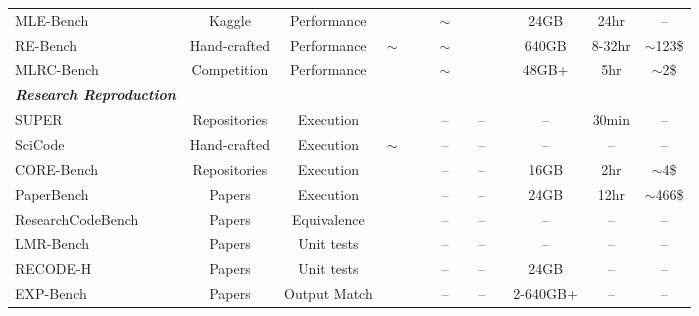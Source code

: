 \documentclass[11pt]{article}
\let\cite\citep
\newcommand{\gtick}{\textcolor{green!60!black}{\ding{51}}}
\newcommand{\rcross}{\textcolor{red!70!black}{\ding{55}}}
\theoremstyle{plain}
\theoremstyle{definition}
\theoremstyle{remark}
\begin{document}
\begin{table}[ht]
{\begin{tabularx}{1.2\textwidth}{@{}l*{12}{c}}
MLE-Bench \cite{chan2025mlebench}           & Kaggle & Performance & \rcross & \rcross & \gtick & $\sim$  & \rcross & \rcross & \rcross & 24GB & 24hr & -- \\
RE-Bench \cite{wijk2025rebench}             & Hand-crafted & Performance & $\sim$ & \rcross & \gtick & $\sim$  & \rcross & \rcross & \rcross & 640GB & 8-32hr & $\sim$123\$ \\
MLRC-Bench \cite{zhang2025mlrcbenchlanguageagentssolve} & Competition & Performance & \rcross & \rcross & \gtick & $\sim$ & \rcross & \gtick & \rcross & 48GB+ & 5hr & $\sim$2\$\\
\midrule
\textbf{\emph{Research Reproduction}} &  &  &  &  &  &  &  &  &  \\
\midrule
SUPER \cite{bogin-etal-2024-super}          & Repositories & Execution & \rcross & \rcross & \rcross & -- & \rcross & -- & \gtick & -- & 30min & --\\
SciCode \cite{tian2024scicode}               & Hand-crafted & Execution & $\sim$ & \rcross & \gtick & -- & \rcross & -- & \gtick & -- & -- & --\\
CORE-Bench \cite{siegel2024corebench}      & Repositories & Execution & \rcross & \gtick & \gtick & -- & \gtick & -- & \gtick & 16GB & 2hr & $\sim$4\$\\
PaperBench \cite{starace2025paperbench}      & Papers & Execution & \gtick & \rcross & \gtick & -- & \gtick & -- & \rcross & 24GB & 12hr & $\sim$466\$\\
ResearchCodeBench \cite{hua2025researchcodebenchbenchmarkingllmsimplementing} & Papers & Equivalence & \rcross & \gtick & \gtick & -- & \rcross & -- & \gtick & -- & -- & --\\
LMR-Bench \cite{yan2025lmrbenchevaluatingllmagents} & Papers & Unit tests & \rcross & \rcross & \rcross & -- & \rcross & -- & \rcross & -- & -- & --\\
RECODE-H \cite{miao2025recodehbenchmarkresearchcode} & Papers & Unit tests & \rcross & \rcross & \gtick & -- & \rcross & -- & \gtick & 24GB & -- & --\\
EXP-Bench\cite{kon2025expbenchaiconductai} & Papers & Output Match & \rcross & \rcross & \gtick & -- & \rcross & -- & \rcross & 2-640GB+ & -- & --\\


\end{tabularx}}
\end{table}
\end{document}
